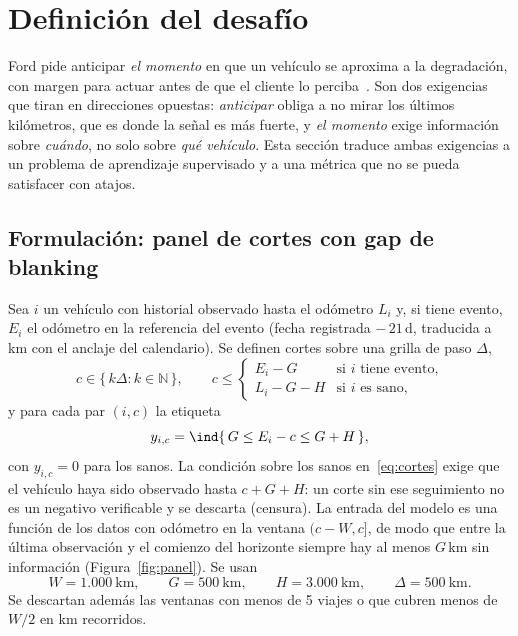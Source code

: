 \section{Definición del desafío}
\label{sec:definicion}

Ford pide anticipar \emph{el momento} en que un vehículo se aproxima a la degradación, con margen para actuar antes de que
el cliente lo perciba~\cite{ford}. Son dos exigencias que tiran en direcciones opuestas: \emph{anticipar} obliga a no
mirar los últimos kilómetros, que es donde la señal es más fuerte, y \emph{el momento} exige información sobre
\emph{cuándo}, no solo sobre \emph{qué vehículo}. Esta sección traduce ambas exigencias a un problema de aprendizaje
supervisado y a una métrica que no se pueda satisfacer con atajos.

\subsection{Formulación: panel de cortes con gap de blanking}
\label{sec:panel}

Sea $i$ un vehículo con historial observado hasta el odómetro $L_i$ y, si tiene evento, $E_i$ el odómetro en la referencia
del evento (fecha registrada $-\,21$\,d, traducida a km con el anclaje del calendario). Se definen cortes sobre una grilla
de paso $\Delta$,
\begin{equation}
  c \in \{\, k\Delta : k \in \mathbb{N} \,\}, \qquad
  c \le \begin{cases} E_i - G & \text{si } i \text{ tiene evento,}\\ L_i - G - H & \text{si } i \text{ es sano,} \end{cases}
  \label{eq:cortes}
\end{equation}
y para cada par $(i,c)$ la etiqueta
\begin{equation}
  y_{i,c} = \ind\{\, G \le E_i - c \le G + H \,\},
  \label{eq:etiqueta}
\end{equation}
con $y_{i,c} = 0$ para los sanos. La condición sobre los sanos en~\eqref{eq:cortes} exige que el vehículo haya sido observado
hasta $c + G + H$: un corte sin ese seguimiento no es un negativo verificable y se descarta (censura). La entrada del modelo
es una función de los datos con odómetro en la ventana $(c - W, c]$, de modo que entre la última observación y el comienzo
del horizonte siempre hay al menos $G$\,km sin información (Figura~\ref{fig:panel}). Se usan
\begin{equation}
  W = 1.000\ \text{km}, \qquad G = 500\ \text{km}, \qquad H = 3.000\ \text{km}, \qquad \Delta = 500\ \text{km}.
\end{equation}
Se descartan además las ventanas con menos de 5 viajes o que cubren menos de $W/2$ en km recorridos.

